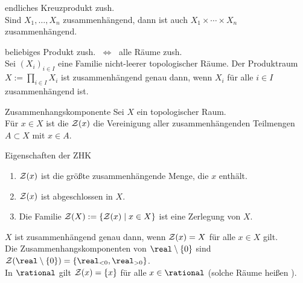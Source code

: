 \begin{Lemma}{endliches Kreuzprodukt zush.}\\
    Sind $X_1, \dotsc, X_n$ zusammenhängend, dann ist auch
    $X_1 \times \dotsb \times X_n$ zusammenhängend.
\end{Lemma}

\begin{Satz}{beliebiges Produkt zush. $\;\Leftrightarrow\;$
             alle Räume zush.} \\
    Sei $(X_i)_{i \in I}$ eine Familie nicht-leerer topologischer Räume.
    Der Produktraum $X := \prod_{i \in I} X_i$ ist zusammenhängend
    genau dann, wenn $X_i$ für alle $i \in I$ zusammenhängend ist.
\end{Satz}

\linie
\pagebreak

\begin{Def}{Zusammenhangskomponente}
    Sei $X$ ein topologischer Raum. \\
    Für $x \in X$ ist die 
    $\mathcal{Z}(x)$ die Vereinigung aller zusammenhängenden Teilmengen $A \subset X$
    mit $x \in A$.
\end{Def}

\begin{Satz}{Eigenschaften der ZHK}
    \begin{enumerate}
        \item
        $\mathcal{Z}(x)$ ist die größte zusammenhängende Menge, die $x$ enthält.

        \item
        $\mathcal{Z}(x)$ ist abgeschlossen in $X$.

        \item
        Die Familie $\mathcal{Z}(X) := \{\mathcal{Z}(x) \;|\; x \in X\}$ ist eine
        Zerlegung von $X$.
    \end{enumerate}
\end{Satz}

\begin{Bsp}
    $X$ ist zusammenhängend genau dann, wenn $\mathcal{Z}(x) = X$ für alle
    $x \in X$ gilt. \\
    Die Zusammenhangskomponenten von $\real \setminus \{0\}$ sind
    $\zhk(\real \setminus \{0\}) = \{\real_{<0}, \real_{>0}\}$. \\
    In $\rational$ gilt $\mathcal{Z}(x) = \{x\}$ für alle $x \in \rational$
    (solche Räume heißen ).
\end{Bsp}

